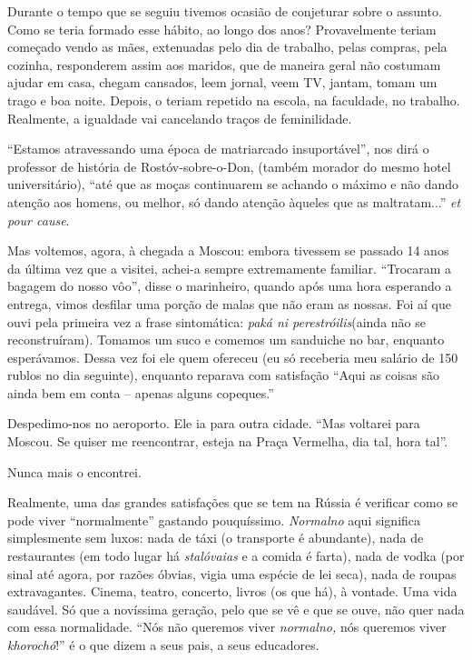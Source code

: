 Durante o tempo que se seguiu tivemos ocasião de conjeturar sobre o
assunto. Como se teria formado esse hábito, ao longo dos anos?
Provavelmente teriam começado vendo as mães, extenuadas pelo dia de
trabalho, pelas compras, pela cozinha, responderem assim aos maridos,
que de maneira geral não costumam ajudar em casa, chegam cansados, leem
jornal, veem TV, jantam, tomam um trago e boa noite. Depois, o teriam
repetido na escola, na faculdade, no trabalho. Realmente, a igualdade
vai cancelando traços de feminilidade.

``Estamos atravessando uma época de matriarcado insuportável'', nos dirá
o professor de história de Rostóv-sobre-o-Don, (também morador do mesmo
hotel universitário), ``até que as moças continuarem se achando o máximo
e não dando atenção aos homens, ou melhor, só dando atenção àqueles que
as maltratam...'' \emph{et pour cause}.

Mas voltemos, agora, à chegada a Moscou: embora tivessem se passado 14
anos da última vez que a visitei, achei-a sempre extremamente familiar.
``Trocaram a bagagem do nosso vôo'', disse o marinheiro, quando após uma
hora esperando a entrega, vimos desfilar uma porção de malas que não
eram as nossas. Foi aí que ouvi pela primeira vez a frase sintomática:
\emph{paká ni perestróilis}(ainda não se reconstruíram). Tomamos um suco
e comemos um sanduiche no bar, enquanto esperávamos. Dessa vez foi ele
quem ofereceu (eu só receberia meu salário de 150 rublos no dia
seguinte), enquanto reparava com satisfação ``Aqui as coisas são ainda
bem em conta -- apenas alguns copeques.''

Despedimo-nos no aeroporto. Ele ia para outra cidade. ``Mas voltarei
para Moscou. Se quiser me reencontrar, esteja na Praça Vermelha, dia
tal, hora tal''.

Nunca mais o encontrei.

Realmente, uma das grandes satisfações que se tem na Rússia é verificar
como se pode viver ``normalmente'' gastando pouquíssimo. \emph{Normalno}
aqui significa simplesmente sem luxos: nada de táxi (o transporte é
abundante), nada de restaurantes (em todo lugar há \emph{stalóvaias} e a
comida é farta), nada de vodka (por sinal até agora, por razões óbvias,
vigia uma espécie de lei seca), nada de roupas extravagantes. Cinema,
teatro, concerto, livros (os que há), à vontade. Uma vida saudável. Só
que a novíssima geração, pelo que se vê e que se ouve, não quer nada com
essa normalidade. ``Nós não queremos viver \emph{normalno,} nós queremos
viver \emph{khorochó}!'' é o que dizem a seus pais, a seus educadores.

